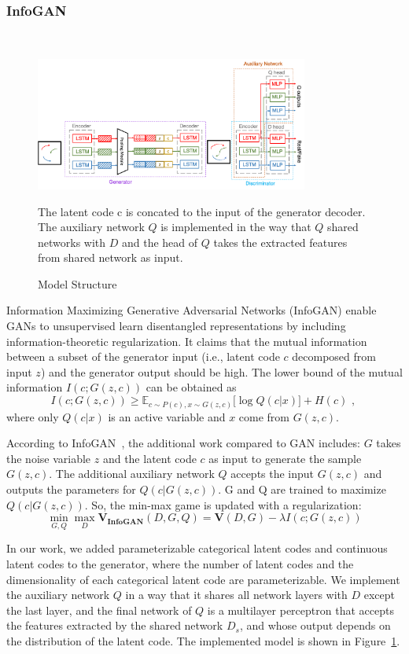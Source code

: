 \subsubsection{InfoGAN}
\hfill \\
\begin{figure}[ht]
  \centering
  \includegraphics[width=0.8\textwidth]{figures/arch.png}
  \caption{Model Structure}{The latent code c is concated to the input of the generator decoder. The auxiliary network $Q$ is implemented in the way that $Q$ shared networks with $D$ and the head of $Q$ takes the extracted features from shared network as input.}
  \label{arch}
\end{figure}
Information Maximizing Generative Adversarial Networks (InfoGAN) enable GANs to unsupervised learn disentangled representations by including information-theoretic regularization. It claims that the mutual information between a subset of the generator input (i.e., latent code $c$ decomposed from input $z$) and the generator output should be high. The lower bound of the mutual information $I(c; G(z, c))$ can be obtained as $$I(c; G(z, c)) \geq \mathbb{E}_{c \sim P(c), x \sim G(z, c)} \lbrack \log Q(c | x) \rbrack + H(c) \text{ , }$$ where only $Q(c | x)$ is an active variable and $x$ come from $G(z, c)$.

According to InfoGAN~\cite{infogan}, the additional work compared to GAN includes: $G$ takes the noise variable $z$ and the latent code $c$ as input to generate the sample $G(z, c)$. The additional auxiliary network $Q$ accepts the input $G(z, c)$ and outputs the parameters for $Q(c|G(z, c))$. G and Q are trained to maximize $Q(c | G(z, c))$. So, the min-max game is updated with a regularization: \[\min_{G,Q}\max_{D} \mathbf{V_{InfoGAN}}(D, G, Q) = \mathbf{V}(D, G) - \lambda I(c; G(z, c)) \]

In our work, we added parameterizable categorical latent codes and continuous latent codes to the generator, where the number of latent codes and the dimensionality of each categorical latent code are parameterizable. We implement the auxiliary network $Q$ in a way that it shares all network layers with $D$ except the last layer, and the final network of $Q$ is a multilayer perceptron that accepts the features extracted by the shared network $D_s$, and whose output depends on the distribution of the latent code. The implemented model is shown in Figure~\ref{arch}.

